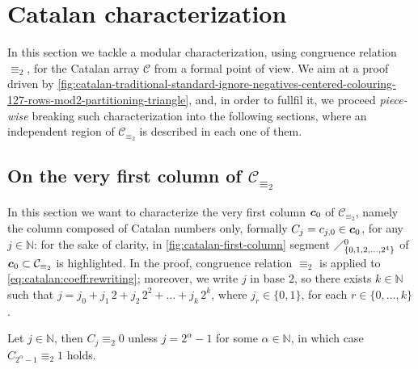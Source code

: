 
\section{Catalan characterization}
\label{sec:catalan:characterization}

In this section we tackle a modular characterization, using congruence relation
$\equiv_{2}$, for the Catalan array $\mathcal{C}$ from a formal point of view.
We aim at a proof driven by
\autoref{fig:catalan-traditional-standard-ignore-negatives-centered-colouring-127-rows-mod2-partitioning-triangle},
and, in order to fullfil it, we proceed \emph{piece-wise} breaking such
characterization into the following sections, where an independent region of
$\mathcal{C}_{\equiv_{2}}$ is described in each one of them.


\subsection{On the very first column of $\mathcal{C}_{\equiv_{2}}$}

In this section we want to characterize the very first column $\boldsymbol{c}_{0}$
of $\mathcal{C}_{\equiv_{2}}$, namely the column composed of Catalan numbers only,
formally $C_{j}=c_{j,0}\in\boldsymbol{c}_{0}$, for any $j\in\mathbb{N}$:  
for the sake of clarity, in \autoref{fig:catalan-first-column} segment
$\diagup_{\lbrace 0,1,2,\ldots,2^{4}\rbrace}^{0}$ of $\boldsymbol{c}_{0}\subset\mathcal{C}_{\equiv_{2}}$
is highlighted. In the proof, congruence relation $\equiv_{2}$ is applied to \autoref{eq:catalan:coeff:rewriting};
moreover, we write $j$ in base $2$, so there exists $k\in\mathbb{N}$ such that 
$j=j_{0} + j_{1}\,2 + j_{2}\,2^{2} + \ldots + j_{k}\,2^{k}$, where
$j_{r}\in\lbrace0,1\rbrace$, for each $r\in\lbrace0,\ldots,k\rbrace$. 

\begin{theorem}
    Let $j\in\mathbb{N}$, then $C_{j} \equiv_{2} 0$ unless $j=2^{\alpha}-1$ for some $\alpha\in\mathbb{N}$, 
    in which case $C_{2^{\alpha}-1} \equiv_{2} 1$ holds.
\end{theorem}

